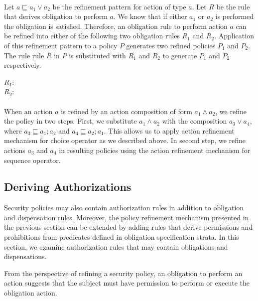\documentclass[12pt,journal,letterpaper,onecolumn]{IEEEtran}
\begin{document}
\\
Let $a \sqsubseteq a_1 \vee a_2$ be the refinement pattern for action
of type $a$. Let $R$ be the rule that derives obligation to perform $a$.
We know that if either $a_1$ or $a_2$ is performed the obligation
is satisfied. Therefore, an obligation rule to perform action $a$
can be refined into either of the following two obligation rules $R_1$
and $R_2$. Application of this refinement pattern to a policy $P$
generates two refined policies $P_1$ and $P_2$. The rule
rule $R$ in $P$ is substituted with $R_1$ and $R_2$ to generate
$P_1$ and $P_2$ respectively.

\noindent
$R_1$:   \\
$R_2$: \\


\\
When an action $a$ is refined by an action composition of form
$a_1 \wedge a_2$, we refine the policy in two steps. First, we
substitute $a_1 \wedge a_2$ with the composition $a_3 \vee a_4$,
where $a_3 \sqsubseteq a_1;a_2$ and $a_4 \sqsubseteq a_2;a_1$.
This allows us to apply action refinement mechanism for choice operator
as we described above. In second step, we refine actions $a_3$
and $a_4$ in resulting policies using the action refinement
mechanism for sequence operator.




\subsection{Deriving Authorizations}

Security policies may also contain authorization rules in addition
to obligation and dispensation rules. Moreover, the policy
refinement mechanism presented in the previous section can be
extended by adding rules that derive permissions and prohibitions from
predicates defined in obligation specification strata. In this
section, we examine authorization rules that may contain obligations
and dispensations.

From the perspective of refining a security policy, an obligation to
perform an action suggests that the subject must have permission to
perform or execute the obligation action.
\end{document}
